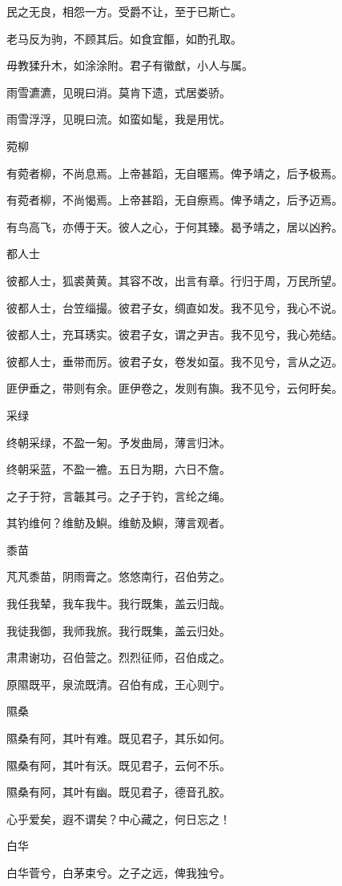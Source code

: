民之无良，相怨一方。受爵不让，至于已斯亡。

老马反为驹，不顾其后。如食宜饇，如酌孔取。

毋教猱升木，如涂涂附。君子有徽猷，小人与属。

雨雪瀌瀌，见晛曰消。莫肯下遗，式居娄骄。

雨雪浮浮，见晛曰流。如蛮如髦，我是用忧。

菀柳

有菀者柳，不尚息焉。上帝甚蹈，无自暱焉。俾予靖之，后予极焉。

有菀者柳，不尚愒焉。上帝甚蹈，无自瘵焉。俾予靖之，后予迈焉。

有鸟高飞，亦傅于天。彼人之心，于何其臻。曷予靖之，居以凶矜。

都人士

彼都人士，狐裘黄黄。其容不改，出言有章。行归于周，万民所望。

彼都人士，台笠缁撮。彼君子女，绸直如发。我不见兮，我心不说。

彼都人士，充耳琇实。彼君子女，谓之尹吉。我不见兮，我心苑结。

彼都人士，垂带而厉。彼君子女，卷发如虿。我不见兮，言从之迈。

匪伊垂之，带则有余。匪伊卷之，发则有旟。我不见兮，云何盱矣。

采绿

终朝采绿，不盈一匊。予发曲局，薄言归沐。

终朝采蓝，不盈一襜。五日为期，六日不詹。

之子于狩，言韔其弓。之子于钓，言纶之绳。

其钓维何？维鲂及鱮。维鲂及鱮，薄言观者。

黍苗

芃芃黍苗，阴雨膏之。悠悠南行，召伯劳之。

我任我辇，我车我牛。我行既集，盖云归哉。

我徒我御，我师我旅。我行既集，盖云归处。

肃肃谢功，召伯营之。烈烈征师，召伯成之。

原隰既平，泉流既清。召伯有成，王心则宁。

隰桑

隰桑有阿，其叶有难。既见君子，其乐如何。

隰桑有阿，其叶有沃。既见君子，云何不乐。

隰桑有阿，其叶有幽。既见君子，德音孔胶。

心乎爱矣，遐不谓矣？中心藏之，何日忘之！

白华

白华菅兮，白茅束兮。之子之远，俾我独兮。

